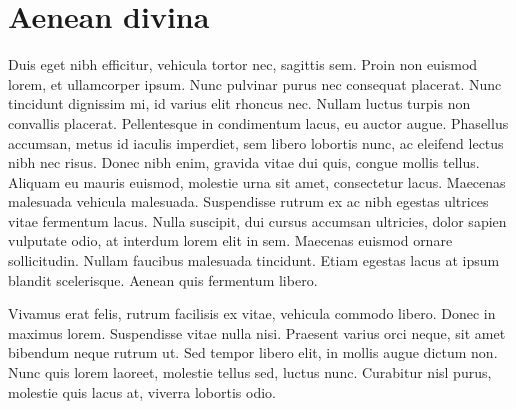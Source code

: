 \section{Aenean divina}

Duis eget nibh efficitur, vehicula tortor nec, sagittis sem. Proin non euismod lorem, et ullamcorper ipsum. Nunc pulvinar purus nec consequat placerat. Nunc tincidunt dignissim mi, id varius elit rhoncus nec. Nullam luctus turpis non convallis placerat. Pellentesque in condimentum lacus, eu auctor augue. Phasellus accumsan, metus id iaculis imperdiet, sem libero lobortis nunc, ac eleifend lectus nibh nec risus. Donec nibh enim, gravida vitae dui quis, congue mollis tellus. Aliquam eu mauris euismod, molestie urna sit amet, consectetur lacus. Maecenas malesuada vehicula malesuada. Suspendisse rutrum ex ac nibh egestas ultrices vitae fermentum lacus. Nulla suscipit, dui cursus accumsan ultricies, dolor sapien vulputate odio, at interdum lorem elit in sem. Maecenas euismod ornare sollicitudin. Nullam faucibus malesuada tincidunt. Etiam egestas lacus at ipsum blandit scelerisque. Aenean quis fermentum libero.

Vivamus erat felis, rutrum facilisis ex vitae, vehicula commodo libero. Donec in maximus lorem. Suspendisse vitae nulla nisi. Praesent varius orci neque, sit amet bibendum neque rutrum ut. Sed tempor libero elit, in mollis augue dictum non. Nunc quis lorem laoreet, molestie tellus sed, luctus nunc. Curabitur nisl purus, molestie quis lacus at, viverra lobortis odio.
